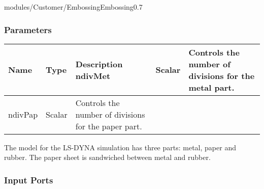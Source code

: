 \begin{htmlonly}
%
\begin{covimg2}{modules/Customer/Embossing}{Embossing}{0.7}\end{covimg2}



%
%

%
\subsubsection{Parameters}
%


\begin{longtable}{|p{2.5cm}|p{2cm}|p{8.5cm}|}
\hline
   \bf{Name} & \bf{Type} & \bf{Description} \endhead
\hline\hline
	ndivMet & Scalar & Controls the number of divisions for the metal part.\\
\hline
	ndivPap & Scalar & Controls the number of divisions for the paper part.\\
\hline
\end{longtable}

The model for the LS-DYNA simulation has three parts: metal, paper and rubber.
The paper sheet is sandwiched between metal and rubber.


%
\subsubsection{Input Ports}
%



\end{htmlonly}
